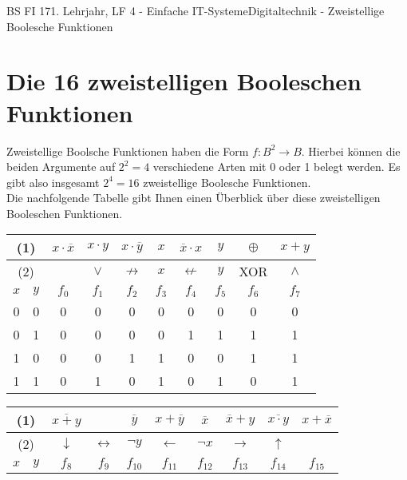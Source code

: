 \documentclass[11pt,oneside,openany,headings=optiontotoc,11pt,numbers=noenddot]{article}
\begin{document}
	\begin{worksheet}{BS FI 17}{1. Lehrjahr, LF 4 - Einfache IT-Systeme}{Digitaltechnik - Zweistellige Boolesche Funktionen}
		\section{Die 16 zweistelligen Booleschen Funktionen}
		Zweistellige Boolsche Funktionen haben die Form \(f: B^2 \rightarrow B\). Hierbei können die beiden Argumente auf \(2^2 = 4\) verschiedene Arten mit 0 oder 1 belegt werden. Es gibt also insgesamt \(2^4 = 16\) zweistellige Boolesche Funktionen.\\
		Die nachfolgende Tabelle gibt Ihnen einen Überblick über diese zweistelligen Booleschen Funktionen.\\
		\begin{center}
			\begin{tabular}{|cc|c|c|c|c|c|c|c|c|}
				\hline
				\multicolumn{2}{|c|}{(1)} & \(x\cdot\overline{x}\) & \(x\cdot y\) & \(x\cdot\overline{y}\) & \(x\) & \(\overline{x}\cdot x\) & \(y\) & \(\oplus\)& \(x+y\)\\
				\hline
				\multicolumn{2}{|c|}{(2)} & \(\) & \(\lor\) & \(\not\rightarrow\) & \(x\) & \(\not\leftarrow\) & \(y\) & XOR & \(\land\)\\
				\hline
				\(x\) & \(y\) & \(f_0\) & \(f_1\) & \(f_2\) & \(f_3\) & \(f_4\) & \(f_5\) & \(f_6\) & \(f_7\)\\
				\hline
				0 & 0 & 0 & 0 & 0 & 0 & 0 & 0 & 0 & 0\\
				\hline
				0 & 1 & 0 & 0 & 0 & 0 & 1 & 1 & 1 & 1\\
				\hline
				1 & 0 & 0 & 0 & 1 & 1 & 0 & 0 & 1 & 1\\
				\hline
				1 & 1 & 0 & 1 & 0 & 1 & 0 & 1 & 0 & 1\\
				\hline
			\end{tabular}
			\par\bigskip\noindent
			\begin{tabular}{|cc|c|c|c|c|c|c|c|c|}
				\hline
				\multicolumn{2}{|c|}{(1)} & \(\overline{x+y}\) & \(\) & \(\overline{y}\) & \(x + \overline{y}\) & \(\overline{x}\) & \(\overline{x} + y\) & \(\overline{x\cdot y}\) & \(x+\overline{x}\)\\
				\hline
				\multicolumn{2}{|c|}{(2)} & \(\downarrow\) & \(\leftrightarrow\) & \(\neg y\) & \(\leftarrow\) & \(\neg x\) & \(\rightarrow\) & \(\uparrow\) & \\
				\hline
				\(x\) & \(y\) & \(f_8\) & \(f_9\) & \(f_{10}\) & \(f_{11}\) & \(f_{12}\) & \(f_{13}\) & \(f_{14}\) & \(f_{15}\)\\

\end{tabular}
\end{center}
\end{worksheet}
\end{document}
